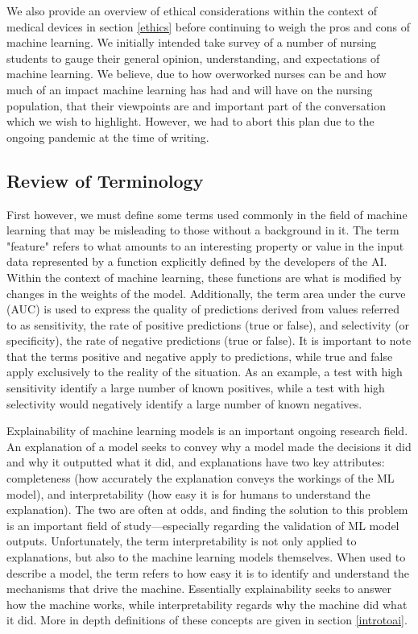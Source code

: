 \documentclass[]{article}
\begin{document}
		We also provide an overview of ethical considerations within the context of medical devices in section \ref{ethics} before continuing to weigh the pros and cons of machine learning. We initially intended take survey of a number of nursing students to gauge their general opinion, understanding, and expectations of machine learning. We believe, due to how overworked nurses can be\cite{doi:10.1111/j.1365-2648.2009.05082.x} and how much of an impact machine learning has had and will have on the nursing population\cite{Ham2017}, that their viewpoints are and important part of the conversation which we wish to highlight. However, we had to abort this plan due to the ongoing pandemic at the time of writing.

		\subsection{Review of Terminology}
			First however, we must define some terms used commonly in the field of machine learning that may be misleading to those without a background in it. The term "feature" refers to what amounts to an interesting property or value in the input data represented by a function explicitly defined by the developers of the AI. Within the context of machine learning, these functions are what is modified by changes in the weights of the model. Additionally, the term area under the curve (AUC) is used to express the quality of predictions derived from values referred to as sensitivity, the rate of positive predictions (true or false), and selectivity (or specificity), the rate of negative predictions (true or false). It is important to note that the terms positive and negative apply to predictions, while true and false apply exclusively to the reality of the situation. As an example, a test with high sensitivity identify a large number of known positives, while a test with high selectivity would negatively identify a large number of known negatives.\cite{introtoauc,econ2020sense}

			Explainability of machine learning models is an important ongoing research field. An explanation of a model seeks to convey why a model made the decisions it did and why it outputted what it did, and explanations have two key attributes: completeness (how accurately the explanation conveys the workings of the ML model), and interpretability (how easy it is for humans to understand the explanation). The two are often at odds, and finding the solution to this problem is an important field of study\cite{8631448}---especially regarding the validation of ML model outputs.\cite{10.1145/3328519.3329126} Unfortunately, the term interpretability is not only applied to explanations, but also to the machine learning models themselves. When used to describe a model, the term refers to how easy it is to identify and understand the mechanisms that drive the machine. Essentially explainability seeks to answer how the machine works, while interpretability regards why the machine did what it did.\cite{8631448} More in depth definitions of these concepts are given in section \ref{introtoai}.
\end{document}
